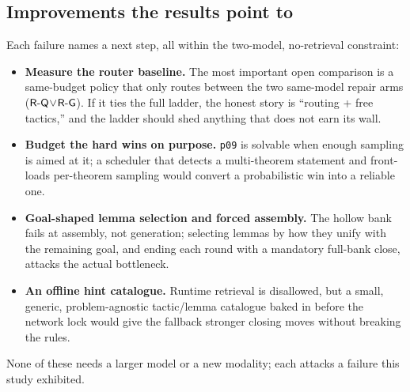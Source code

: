 \subsection{Improvements the results point to}
Each failure names a next step, all within the two-model, no-retrieval constraint:
\begin{itemize}
  \item \textbf{Measure the router baseline.} The most important open comparison is
        a same-budget policy that only routes between the two same-model repair
        arms ($\textsf{R-Q}\!\lor\!\textsf{R-G}$). If it ties the full ladder, the honest story is
        ``routing + free tactics,'' and the ladder should shed anything that does
        not earn its wall.
  \item \textbf{Budget the hard wins on purpose.} \texttt{p09} is solvable when
        enough sampling is aimed at it; a scheduler that detects a multi-theorem
        statement and front-loads per-theorem sampling would convert a
        probabilistic win into a reliable one.
  \item \textbf{Goal-shaped lemma selection and forced assembly.} The hollow bank
        fails at assembly, not generation; selecting lemmas by how they unify with
        the remaining goal, and ending each round with a mandatory full-bank close,
        attacks the actual bottleneck.
  \item \textbf{An offline hint catalogue.} Runtime retrieval is disallowed, but a
        small, generic, problem-agnostic tactic/lemma catalogue baked in before the
        network lock would give the fallback stronger closing moves without
        breaking the rules.
\end{itemize}
None of these needs a larger model or a new modality; each attacks a failure this
study exhibited.
